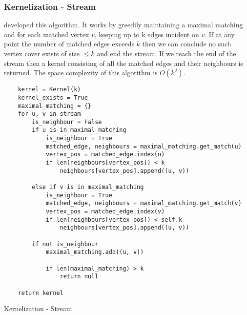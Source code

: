 \subsubsection{Kernelization - Stream}

\cite{chitnis2015parameterized} developed this algorithm. It
works by greedily maintaining a maximal matching and for each matched
vertex \(v\), keeping up to k edges incident on \(v\). If at any point
the number of matched edges exceeds \(k\) then we can conclude no such
vertex cover exists of size \(\leq k\) and end the stream. If we reach
the end of the stream then a kernel consisting of all the matched edges
and their neighbours is returned. The space complexity of this algorithm
is \(O(k^2)\).

\begin{verbatim}
    kernel = Kernel(k)
    kernel_exists = True
    maximal_matching = {}
    for u, v in stream
        is_neighbour = False
        if u is in maximal_matching
            is_neighbour = True
            matched_edge, neighbours = maximal_matching.get_match(u)
            vertex_pos = matched_edge.index(u)
            if len(neighbours[vertex_pos]) < k
                neighbours[vertex_pos].append((u, v))

        else if v is in maximal_matching
            is_neighbour = True
            matched_edge, neighbours = maximal_matching.get_match(v)
            vertex_pos = matched_edge.index(v)
            if len(neighbours[vertex_pos]) < self.k
                neighbours[vertex_pos].append((u, v))

        if not is_neighbour
            maximal_matching.add((u, v))

            if len(maximal_matching) > k
                return null

    return kernel
\end{verbatim}

\begin{algorithm}[H]
    \caption{Kernelization - Stream}
    \DontPrintSemicolon

\end{algorithm}

